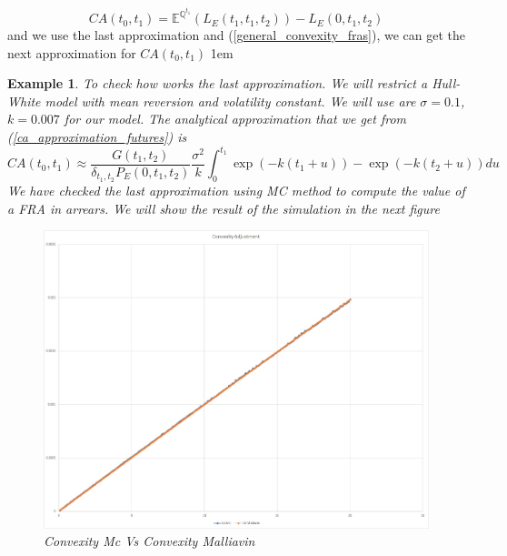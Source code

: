 \documentclass[a4paper,10pt]{article}
\newtheorem{example}[theorem]{Example}
\newcommand{\1}{\mathbf{1}}
\begin{document}
\begin{equation*}
CA(t_0,t_1) = \mathbb{E}^{\mathbb{Q}^{t_1}}\left( L_{E}\left(t_1,t_1,t_2\right)\right) - L_{E}\left(0,t_1,t_2\right)
\end{equation*}
and we use the last approximation and (\ref{general_convexity_fras}), we can get the next approximation for $CA(t_0,t_1)$ 
\hspace{2cm}
\fboxsep1em
\begin{example}
To check how works the last approximation. We will restrict a Hull-White model with mean reversion and volatility constant. We will use are $\sigma=0.1$, $k=0.007$ for our model. The analytical approximation that we get from (\ref{ca_approximation_futures}) is
\begin{equation*}
CA(t_0,t_1) \approx \frac{G(t_1,t_2)}{\delta_{t_1,t_2}P_{E}(0,t_1,t_2)}  \frac{\sigma^{2}}{k} \int_{0}^{t_1} \exp(- k(t_1 + u)) -   \exp(- k(t_2 + u)) du 
\end{equation*}
We have checked the last approximation using MC method to compute the value of a FRA in arrears. We will show the result of the simulation in the next figure

\begin{figure}[h]
	\begin{center}
		\includegraphics[scale=0.3]{Figures/fra_convexity.jpg}
		\caption{Convexity Mc Vs Convexity Malliavin}
	\end{center}
\end{figure} 
 
\end{example}
\end{document}
